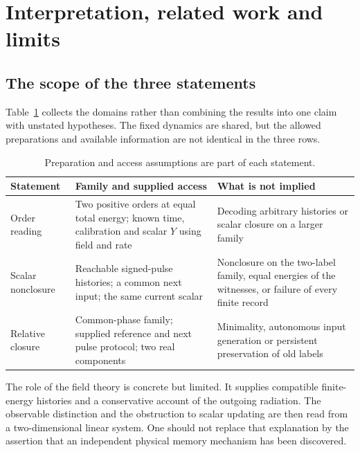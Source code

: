 \documentclass[11pt,a4paper]{article}
\theoremstyle{remark}
\begin{document}
\section{Interpretation, related work and limits}
\label{sec:discussion}

\subsection{The scope of the three statements}

Table~\ref{tab:scope} collects the domains rather than combining the
results into one claim with unstated hypotheses. The fixed dynamics
are shared, but the allowed preparations and available information
are not identical in the three rows.

\begin{table}[htbp]
\centering
\small
\renewcommand{\arraystretch}{1.2}
\begin{tabularx}{\textwidth}{@{}>{\raggedright\arraybackslash}p{}>{\raggedright\arraybackslash}X>{\raggedright\arraybackslash}X@{}}
\toprule
Statement & Family and supplied access & What is not implied \\
\midrule
Order reading & Two positive orders at equal total energy; known time,
calibration and scalar $Y$ using field and rate & Decoding arbitrary
histories or scalar closure on a larger family \\
Scalar nonclosure & Reachable signed-pulse histories; a common next
input; the same current scalar & Nonclosure on the two-label family,
equal energies of the witnesses, or failure of every finite record \\
Relative closure & Common-phase family; supplied reference and next
pulse protocol; two real components & Minimality, autonomous input
generation or persistent preservation of old labels \\
\bottomrule
\end{tabularx}
\caption{Preparation and access assumptions are part of each statement.}
\label{tab:scope}
\end{table}

The role of the field theory is concrete but limited. It supplies
compatible finite-energy histories and a conservative account of the
outgoing radiation. The observable distinction and the obstruction to
scalar updating are then read from a two-dimensional linear system.
One should not replace that explanation by the assertion that an
independent physical memory mechanism has been discovered.
\end{document}
